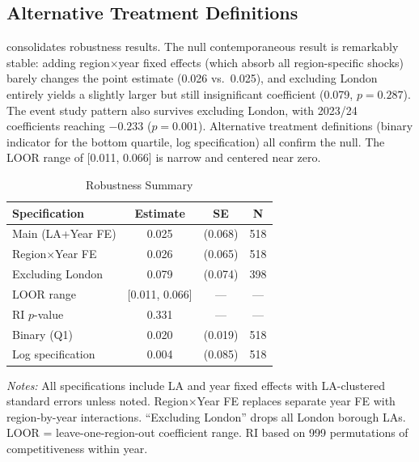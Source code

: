 \documentclass[12pt]{article}
\begin{document}
\subsection{Alternative Treatment Definitions}

 consolidates robustness results. The null contemporaneous result is remarkably stable: adding region$\times$year fixed effects (which absorb all region-specific shocks) barely changes the point estimate (0.026 vs.\ 0.025), and excluding London entirely yields a slightly larger but still insignificant coefficient (0.079, $p = 0.287$). The event study pattern also survives excluding London, with 2023/24 coefficients reaching $-0.233$ ($p = 0.001$). Alternative treatment definitions (binary indicator for the bottom quartile, log specification) all confirm the null. The LOOR range of [0.011, 0.066] is narrow and centered near zero.

\begin{table}[H]
\centering
\caption{Robustness Summary}
\label{tab:robustness}
\begin{threeparttable}
\begin{tabular}{lccc}
\toprule
Specification & Estimate & SE & N \\
\midrule
Main (LA+Year FE) & 0.025 & (0.068) & 518 \\
Region$\times$Year FE & 0.026 & (0.065) & 518 \\
Excluding London & 0.079 & (0.074) & 398 \\
LOOR range & [0.011, 0.066] & --- & --- \\
RI $p$-value & 0.331 & --- & --- \\
Binary (Q1) & 0.020 & (0.019) & 518 \\
Log specification & 0.004 & (0.085) & 518 \\
\bottomrule
\end{tabular}
\begin{tablenotes}[flushleft]
\small
\item \textit{Notes:} All specifications include LA and year fixed effects with LA-clustered standard errors unless noted. Region$\times$Year FE replaces separate year FE with region-by-year interactions. ``Excluding London'' drops all London borough LAs. LOOR = leave-one-region-out coefficient range. RI based on 999 permutations of competitiveness within year.
\end{tablenotes}
\end{threeparttable}
\end{table}
\end{document}
